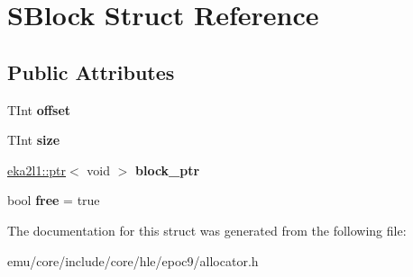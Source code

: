 \hypertarget{struct_s_block}{}\section{S\+Block Struct Reference}
\label{struct_s_block}
\subsection*{Public Attributes}
\begin{DoxyCompactItemize}
\item 
\mbox{\label{struct_s_block_ac41e46ba17c3f0dd8861b2e7d6ce1f18}} 
T\+Int {\bfseries offset}
\item 
\mbox{\label{struct_s_block_aa29700dbbc320d0cbc9fe8388bb1762e}} 
T\+Int {\bfseries size}
\item 
\mbox{\label{struct_s_block_ad3d0e7dd7fc8e4d6c7997b6379e43746}} 
\mbox{\hyperlink{classeka2l1_1_1ptr}{eka2l1\+::ptr}}$<$ void $>$ {\bfseries block\+\_\+ptr}
\item 
\mbox{\label{struct_s_block_aef18649ed6b19a5e717870ad1d824028}} 
bool {\bfseries free} = true
\end{DoxyCompactItemize}


The documentation for this struct was generated from the following file\+:\begin{DoxyCompactItemize}
\item 
emu/core/include/core/hle/epoc9/allocator.\+h\end{DoxyCompactItemize}
